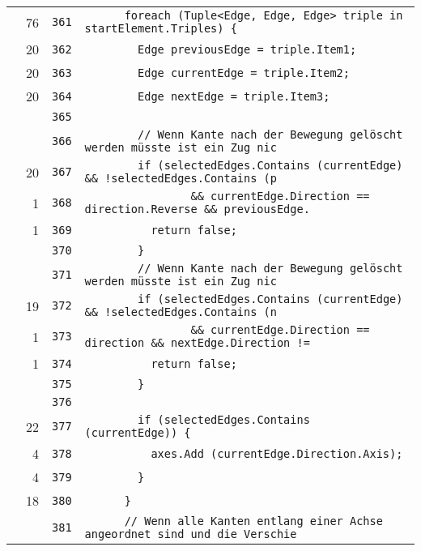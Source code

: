 \documentclass[a4paper,10pt]{article}
\begin{document}
\begin{longtable}[l]{lrrl}
\cellcolor{green} & 76 & \verb~361~ & \verb~      foreach (Tuple<Edge, Edge, Edge> triple in startElement.Triples) {~\\
\cellcolor{green} & 20 & \verb~362~ & \verb~        Edge previousEdge = triple.Item1;~\\
\cellcolor{green} & 20 & \verb~363~ & \verb~        Edge currentEdge = triple.Item2;~\\
\cellcolor{green} & 20 & \verb~364~ & \verb~        Edge nextEdge = triple.Item3;~\\
\cellcolor{gray} &  & \verb~365~ & \verb~~\\
\cellcolor{gray} &  & \verb~366~ & \verb~        // Wenn Kante nach der Bewegung gelöscht werden müsste ist ein Zug nic~\\
\cellcolor{green} & 20 & \verb~367~ & \verb~        if (selectedEdges.Contains (currentEdge) && !selectedEdges.Contains (p~\\
\cellcolor{green} & 1 & \verb~368~ & \verb~                && currentEdge.Direction == direction.Reverse && previousEdge.~\\
\cellcolor{green} & 1 & \verb~369~ & \verb~          return false;~\\
\cellcolor{gray} &  & \verb~370~ & \verb~        }~\\
\cellcolor{gray} &  & \verb~371~ & \verb~        // Wenn Kante nach der Bewegung gelöscht werden müsste ist ein Zug nic~\\
\cellcolor{green} & 19 & \verb~372~ & \verb~        if (selectedEdges.Contains (currentEdge) && !selectedEdges.Contains (n~\\
\cellcolor{green} & 1 & \verb~373~ & \verb~                && currentEdge.Direction == direction && nextEdge.Direction !=~\\
\cellcolor{green} & 1 & \verb~374~ & \verb~          return false;~\\
\cellcolor{gray} &  & \verb~375~ & \verb~        }~\\
\cellcolor{gray} &  & \verb~376~ & \verb~~\\
\cellcolor{green} & 22 & \verb~377~ & \verb~        if (selectedEdges.Contains (currentEdge)) {~\\
\cellcolor{green} & 4 & \verb~378~ & \verb~          axes.Add (currentEdge.Direction.Axis);~\\
\cellcolor{green} & 4 & \verb~379~ & \verb~        }~\\
\cellcolor{green} & 18 & \verb~380~ & \verb~      }~\\
\cellcolor{gray} &  & \verb~381~ & \verb~      // Wenn alle Kanten entlang einer Achse angeordnet sind und die Verschie~\\

\end{longtable}
\end{document}
